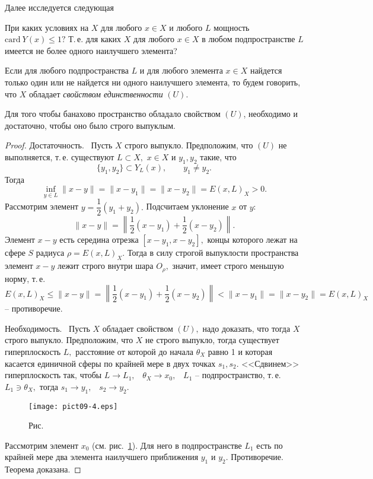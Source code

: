Далее исследуется следующая

 \task %
 При каких условиях на $X$ для любого $x\in X$ и любого $L$
 мощность $\mbox{card}\ Y(x)\le 1?$ Т.\,е. для каких $X$
 для любого $x\in X$ в любом подпространстве $L$
 имеется не более одного наилучшего элемента?

\begin{defi}
 Если для любого подпространства $L$ и для любого элемента $x\in X$
 найдется только один или {не найдется} ни одного наилучшего элемента, то будем
 говорить, что $X$ обладает {\it свойством единственности} $(U).$
 \end{defi}

 \begin{teo} %
 Для того чтобы банахово пространство обладало свойством $(U)$,
 необходимо и достаточно, чтобы оно было строго выпуклым.
 \end{teo}

 \begin{proof} %
 Д\;о\;с\;т\;а\;т\;о\;ч\;н\;о\;с\;т\;ь.~ Пусть $X$ строго выпукло. Предположим, что
 $(U)$ не выполняется, т.\,е. существуют $L\subset X,$ $x\in
 X$ и $y_1,y_2$ такие, что
 $$
 \{y_1,y_2\}\subset Y_L(x),\qquad y_1\ne y_2.
 $$
 Тогда
 $$
 \inf_{y\in L} \|x-y\|=\|x-y_1\|=\|x-y_2\|=E(x,L)_X>0.
 $$
 Рассмотрим элемент $y=\dfrac{1}{2}(y_1+y_2).$ Подсчитаем уклонение $x$
 от $y$:
 $$
 \|x-y\|=\left\| \frac{1}{2} (x-y_1)+\frac{1}{2}(x-y_2) \right\|.
 $$
 Элемент $x-y$ есть середина отрезка $[x-y_1,x-y_2],$ концы
 которого лежат на сфере $S$ радиуса $\rho=E(x,L)_X.$
 Тогда в силу строгой выпуклости пространства элемент $x-y$
 лежит строго внутри шара ${O}_{\rho},$ значит, имеет строго меньшую норму, т.\,е.
 $$
 E(x,L)_X \le \|x-y\|=\left\| \frac{1}{2}(x-y_1)+\frac{1}{2}(x-y_2)
 \right\|<\|x-y_1\|=\|x-y_2\|=E(x,L)_X
 $$
 -- противоречие.



 {Н\;е\;о\;б\;х\;о\;д\;и\;м\;о\;с\;т\;ь.}~ Пусть $X$ обладает свойством $(U),$
 надо доказать, что тогда $X$ строго выпукло. Предположим, что $X$
 не строго выпукло, тогда существует гиперплоскость $L,$
 расстояние от которой до {начала} $\theta_X$ равно 1 и которая
 касается единичной сферы по крайней мере в двух точках $s_1,s_2.$
 <<Сдвинем>> гиперплоскость так, чтобы $L\to L_1,$~ $\theta_X\to x_0,$~ $L_1$
 -- подпространство, т.\,е. $L_1\ni \theta_X,$ тогда $s_1\to y_1,$~ $s_2\to y_2.$

 \bigskip
\begin{figure}[ht]
\begin{center}
\texttt{[image: pict09-4.eps]}
\end{center}
 \bigskip
 \label{r9-4}

 \centerline{Рис.~\theris}
 \bigskip
\end{figure}


 Рассмотрим элемент $x_0$ (см. рис.~\ref{r9-4}). Для него в подпространстве $L_1$
 есть по крайней мере два элемента наилучшего  приближения $y_1$
 и $y_2.$ Противоречие. Теорема доказана.
 \end{proof}


